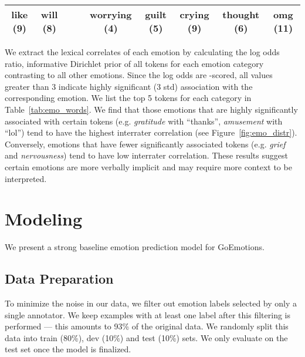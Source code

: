 \documentclass[11pt,a4paper]{article}
\begin{document}
\begin{table*}[t!]
{\begin{centering}
\begin{tabular}{|cccc|ccccc|}
like (9)                                 & will (8)                                 &                                            &                                         & worrying (4)                              & guilt (5)                                   & \multicolumn{1}{c|}{crying (9)}                                   & thought (6)                                & omg (11)                                \\
\hline
\end{tabular}
    \end{centering}
    }
    \caption{Top 5 words associated with each emotion (\colorbox[HTML]{BEECAF}{positive},\colorbox[HTML]{A6CBF7}{negative}, \colorbox[HTML]{FFFC9E}{ambiguous}). The rounded -scored log odds ratios in the parentheses, with the threshold set at 3, indicate significance of association.}
    \label{tab:emo_words}
\end{table*}

We extract the lexical correlates of each emotion by calculating the log odds ratio, informative Dirichlet prior \citep{monroe2008fightin} of all tokens for each emotion category contrasting to all other emotions. Since the log odds are -scored, all values greater than 3 indicate highly significant (3 std) association with the corresponding emotion. We list the top 5 tokens for each category in Table~\ref{tab:emo_words}. We find that those emotions that are highly significantly associated with certain tokens (e.g. \emph{gratitude} with ``thanks'', \emph{amusement} with ``lol'') tend to have the highest interrater correlation (see Figure~\ref{fig:emo_distr}). Conversely, emotions that have fewer significantly associated tokens (e.g. \emph{grief} and \emph{nervousness}) tend to have low interrater correlation. These results suggest certain emotions are more verbally implicit and may require more context to be interpreted. \section{Modeling}

We present a strong baseline emotion prediction model for GoEmotions.

\subsection{Data Preparation}

To minimize the noise in our data, we filter out emotion labels selected by only a single annotator. We keep examples with at least one label after this filtering is performed --- this amounts to 93\% of the original data. We randomly split this data into train (80\%), dev (10\%) and test (10\%) sets. We only evaluate on the test set once the model is finalized.
\end{document}
